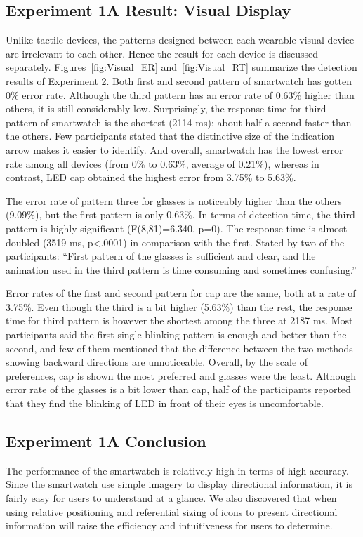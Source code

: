 \documentclass{sigchi}
\begin{document}
\subsection{Experiment 1A Result: Visual Display}
Unlike tactile devices, the patterns designed between each wearable visual device are irrelevant to each other. Hence the result for each device is discussed separately. Figures~\ref{fig:Visual_ER} and~\ref{fig:Visual_RT} summarize the detection results of Experiment 2. Both first and second pattern of smartwatch has gotten 0\% error rate. Although the third pattern has an error rate of 0.63\% higher than others, it is still considerably low. Surprisingly, the response time for third pattern of smartwatch is the shortest (2114 ms); about half a second faster than the others. Few participants stated that the distinctive size of the indication arrow makes it easier to identify. And overall, smartwatch has the lowest error rate among all devices (from 0\% to 0.63\%, average of 0.21\%), whereas in contrast, LED cap obtained the highest error from 3.75\% to 5.63\%.

The error rate of pattern three for glasses is noticeably higher than the others (9.09\%), but the first pattern is only 0.63\%. In terms of detection time, the third pattern is highly significant (F(8,81)=6.340, p=0). The response time is almost doubled (3519 ms, p\textless.0001) in comparison with the first. Stated by two of the participants: \textquotedblleft First pattern of the glasses is sufficient and clear, and the animation used in the third pattern is time consuming and sometimes confusing.\textquotedblright

Error rates of the first and second pattern for cap are the same, both at a rate of 3.75\%. Even though the third is a bit higher (5.63\%) than the rest, the response time for third pattern is however the shortest among the three at 2187 ms. Most participants said the first single blinking pattern is enough and better than the second, and few of them mentioned that the difference between the two methods showing backward directions are unnoticeable. Overall, by the scale of preferences, cap is shown the most preferred and glasses were the least. Although error rate of the glasses is a bit lower than cap, half of the participants reported that they find the blinking of LED in front of their eyes is uncomfortable.

\subsection{Experiment 1A Conclusion}
The performance of the smartwatch is relatively high in terms of high accuracy. Since the smartwatch use simple imagery to display directional information, it is fairly easy for users to understand at a glance. We also discovered that when using relative positioning and referential sizing of icons to present directional information will raise the efficiency and intuitiveness for users to determine.
\end{document}
